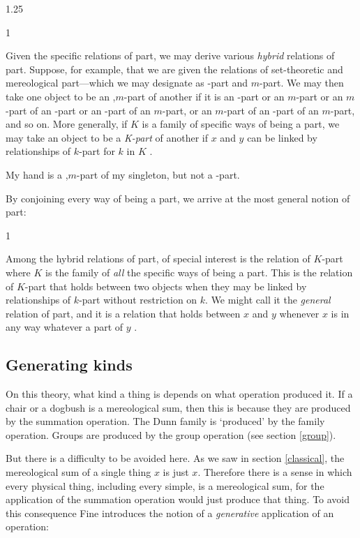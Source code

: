 \documentclass[11pt]{article}
\newenvironment{squote}{%
\begin{spacing}{1}
       	\begin{list}{}{%
\setlength{\labelwidth}{0pt}%
\rightmargin\leftmargin%
}
\item\relax
}{%
\end{list}%
\end{spacing}
}
\begin{document}
\begin{spacing}{1.25}
\begin{squote}
Given the specific relations of part, we may derive various {\em
  hybrid} relations of part.  Suppose, for example, that we are given
the relations of set-theoretic and mereological part---which we may
designate as \textepsilon -part and $m$-part. We may then take one
object to be an \textepsilon ,$m$-part of another if it is an
\textepsilon -part or an $m$-part or an $m$-part of an \textepsilon
-part or an \textepsilon -part of an $m$-part, or an $m$-part of an
\textepsilon -part of an $m$-part, and so on. More generally, if $K$
is a family of specific ways of being a part, we may take an object to
be a {\em K-part} of another if $x$ and $y$ can be linked by
relationships of $k$-part for $k$ in $K$ \citep[579]{fine2010}.
\end{squote}

My hand is a \textepsilon ,$m$-part of my singleton, but not a
\textepsilon -part.

By conjoining every way of being a part, we arrive at the most general
notion of part:

\begin{squote}
Among the hybrid relations of part, of special interest is the
relation of $K$-part where $K$ is the family of {\em all} the specific
ways of being a part.  This is the relation of $K$-part that holds
between two objects when they may be linked by relationships of
$k$-part without restriction on $k$.  We might call it the {\em
  general} relation of part, and it is a relation that holds between
$x$ and $y$ whenever $x$ is in any way whatever a part of $y$
\citep[580]{fine2010}.
\end{squote}

\subsection{Generating kinds}
\label{generate}
On this theory, what kind a thing is depends on what operation
produced it.  If a chair or a dogbush is a mereological sum, then this
is because they are produced by the summation operation.  The Dunn
family is `produced' by the family operation.  Groups are produced by
the group operation (see section \ref{group}).

But there is a difficulty to be avoided here.  As we saw in section
\ref{classical}, the mereological sum of a single thing $x$ is just
$x$.  Therefore there is a sense in which every physical thing,
including every simple, is a mereological sum, for the application of
the summation operation would just produce that thing.  To avoid this
consequence Fine introduces the notion of a {\em generative}
application of an operation:


\end{spacing}
\end{document}
